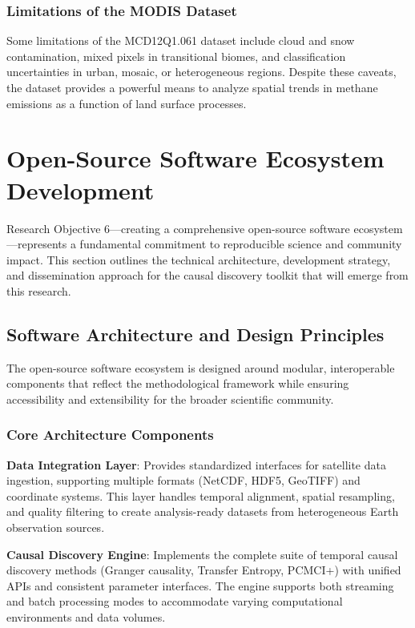 \subsubsection{Limitations of the MODIS Dataset}
Some limitations of the MCD12Q1.061 dataset include cloud and snow contamination, mixed pixels in transitional biomes, and classification uncertainties in urban, mosaic, or heterogeneous regions. Despite these caveats, the dataset provides a powerful means to analyze spatial trends in methane emissions as a function of land surface processes.

\section{Open-Source Software Ecosystem Development}
\label{sec:software_ecosystem}

Research Objective 6—creating a comprehensive open-source software ecosystem—represents a fundamental commitment to reproducible science and community impact. This section outlines the technical architecture, development strategy, and dissemination approach for the causal discovery toolkit that will emerge from this research.

\subsection{Software Architecture and Design Principles}

The open-source software ecosystem is designed around modular, interoperable components that reflect the methodological framework while ensuring accessibility and extensibility for the broader scientific community.

\subsubsection{Core Architecture Components}

\textbf{Data Integration Layer}: Provides standardized interfaces for satellite data ingestion, supporting multiple formats (NetCDF, HDF5, GeoTIFF) and coordinate systems. This layer handles temporal alignment, spatial resampling, and quality filtering to create analysis-ready datasets from heterogeneous Earth observation sources.

\textbf{Causal Discovery Engine}: Implements the complete suite of temporal causal discovery methods (Granger causality, Transfer Entropy, PCMCI+) with unified APIs and consistent parameter interfaces. The engine supports both streaming and batch processing modes to accommodate varying computational environments and data volumes.

